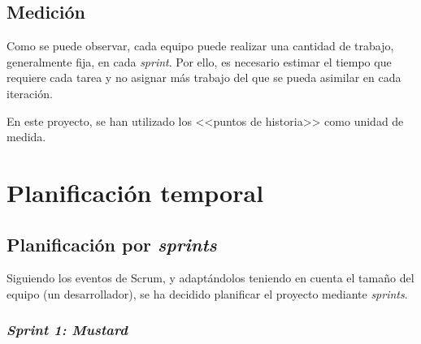 \subsection{Medición}

Como se puede observar, cada equipo puede realizar una cantidad de trabajo, generalmente fija, en cada \textit{sprint}. Por ello, es necesario estimar el tiempo que requiere cada tarea y no asignar más trabajo del que se pueda asimilar en cada iteración.

En este proyecto, se han utilizado los <<puntos de historia>> como unidad de medida.


\section{Planificación temporal}

\subsection{Planificación por \textit{sprints}}
\label{s:planificacion-sprints}
Siguiendo los eventos de Scrum, y adaptándolos teniendo en cuenta el tamaño del equipo (un desarrollador), se ha decidido planificar el proyecto mediante \textit{sprints}.

\subsubsection{\textit{Sprint 1: Mustard}}

